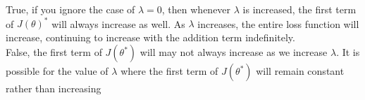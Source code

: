 \documentclass[12pt]{article}
\begin{document}
True, if you ignore the case of $\lambda = 0$, then whenever $\lambda$ is increased, the first term of $J(\theta)^*$ will always increase as well. As $\lambda$ increases, the entire loss function will increase, continuing to increase with the addition term indefinitely.\\

False, the first term of $J(\theta^*)$ will may not always increase as we increase $\lambda$. It is possible for the value of $\lambda$ where the first term of $J(\theta^*)$ will remain constant rather than increasing\\
\end{document}
